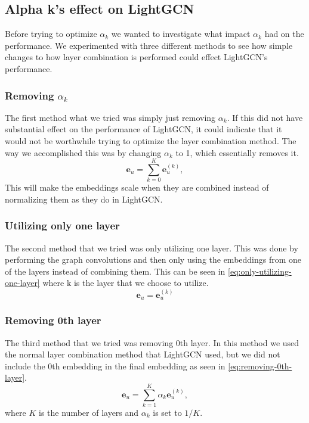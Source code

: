 \subsection{Alpha k's effect on LightGCN}\label{sec:method:alpha-k-effect}
Before trying to optimize $\alpha_k$ we wanted to investigate what impact $\alpha_k$ had on the performance.
We experimented with three different methods to see how simple changes to how layer combination is performed could effect LightGCN's performance.

\subsubsection{Removing $\alpha_k$}
The first method what we tried was simply just removing $\alpha_k$.
If this did not have substantial effect on the performance of LightGCN, it could indicate that it would not be worthwhile trying to optimize the layer combination method.
The way we accomplished this was by changing $\alpha_k$ to 1, which essentially removes it.
\begin{equation}
    \mathbf{e}_u = \sum_{k=0}^{K} \mathbf{e}_u^{(k)},
    \label{eq:removing-alpha-k-lightgcn-sum}
\end{equation}
This will make the embeddings scale when they are combined instead of normalizing them as they do in LightGCN.

\subsubsection{Utilizing only one layer}
The second method that we tried was only utilizing one layer.
This was done by performing the graph convolutions and then only using the embeddings from one of the layers instead of combining them.
This can be seen in \autoref{eq:only-utilizing-one-layer} where k is the layer that we choose to utilize. 
\begin{equation}
	\mathbf{e}_u = \mathbf{e}_u^{(k)}
	\label{eq:only-utilizing-one-layer}
\end{equation}

\subsubsection{Removing 0th layer}
The third method that we tried was removing 0th layer.
In this method we used the normal layer combination method that LightGCN used, but we did not include the 0th embedding in the final embedding as seen in \autoref{eq:removing-0th-layer}.
\begin{equation}
	\mathbf{e}_u = \sum_{k=1}^{K} \alpha_k \mathbf{e}_u^{(k)},
	\label{eq:removing-0th-layer}
\end{equation}
where $K$ is the number of layers and $\alpha_k$ is set to $1/K$.
